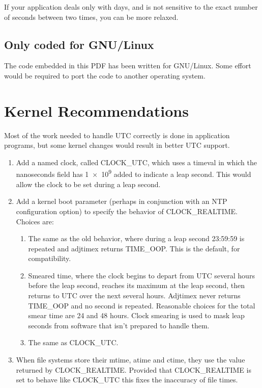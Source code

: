 \documentclass[letterpaper,twoside]{article}
\begin{document}
If your application deals only with days, and is not sensitive
to the exact number of seconds between two times, you can be
more relaxed.

\subsection{Only coded for GNU/Linux}
The code embedded in this PDF has been written for GNU/Linux.
Some effort would be required to port the code to another
operating system.

\section{Kernel Recommendations}
\label{section:KernelRecommendations}
Most of the work needed to handle UTC correctly is done in application
programs, but some kernel changes would result in better UTC support.
\begin{enumerate}
\item Add a named clock, called {\ttfamily CLOCK\_UTC}, which uses
  a {\ttfamily timeval} in which the nanoseconds field has
  \num[retain-unity-mantissa = false]{1e9} added to
  indicate a leap second.  This would allow the clock to be set
  during a leap second.
\item Add a kernel boot parameter (perhaps in conjunction with
  an NTP configuration option) to specify the behavior of
  {\ttfamily CLOCK\_REALTIME}.
  Choices are:
  \begin{enumerate}
  \item The same as the old behavior, where during a leap second
    23:59:59 is repeated and {\ttfamily adjtimex} returns
    {\ttfamily TIME\_OOP}.  This is the default, for compatibility.
  \item Smeared time, where the clock begins to depart from UTC several hours
    before the leap second, reaches its maximum at the leap second, then
    returns to UTC over the next several hours.  {\ttfamily Adjtimex}
    never returns {\ttfamily TIME\_OOP} and no second is repeated.
    Reasonable choices for the total smear time are 24 and 48 hours.
    Clock smearing is used to mask leap seconds from software that isn't
    prepared to handle them.
  \item The same as {\ttfamily CLOCK\_UTC}.
  \end{enumerate}
\item When file systems store their mtime, atime and ctime, they use
  the value returned by {\ttfamily CLOCK\_REALTIME}.  Provided that
  {\ttfamily CLOCK\_REALTIME} is set to behave like {\ttfamily CLOCK\_UTC}
  this fixes the inaccuracy of file times.
\end{enumerate}
\end{document}
